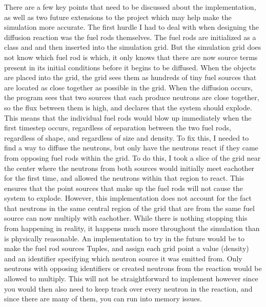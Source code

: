 \documentclass[letterpaper, 12pt]{article}
\begin{document}
      There are a few key points that need to be discussed about the implementation, as well as two future extensions to the project which may help make the simulation more accurate. The first hurdle I had to deal with when designing the diffusion reaction was the fuel rods themselves. The fuel rods are initialized as a class and and then inserted into the simulation grid. But the simulation grid does not know which fuel rod is which, it only knows that there are now source terms present in its initial conditions before it begins to be diffused. When the objects are placed into the grid, the grid sees them as hundreds of tiny fuel sources that are located as close together as possible in the grid. When the diffusion occurs, the program sees that two sources that each produce neutrons are close together, so the flux between them is high, and declares that the system should explode. This means that the individual fuel rods would blow up immediately when the first timestep occurs, regardless of separation between the two fuel rods, regardless of shape, and regardless of size and density. To fix this, I needed to find a way to diffuse the neutrons, but only have the neutrons react if they came from opposing fuel rods within the grid. To do this, I took a slice of the grid near the center where the neutrons from both sources would initially meet eachother for the first time, and allowed the neutrons within that region to react. This ensures that the point sources that make up the fuel rods will not cause the system to explode. However, this implementation does not account for the fact that neutrons in the same central region of the grid that are from the same fuel source can now multiply with eachother. While there is nothing stopping this from happening in reality, it happens much more throughout the simulation than is physically reasonable. An implementation to try in the future would be to make the fuel rod sources Tuples, and assign each grid point a value (density) and an identifier specifying which neutron source it was emitted from. Only neutrons with opposing identifiers or created neutrons from the reaction would be allowed to multiply. This will not be straightforward to implement however since you would then also need to keep track over every neutron in the reaction, and since there are many of them, you can run into memory issues. \\
\end{document}
